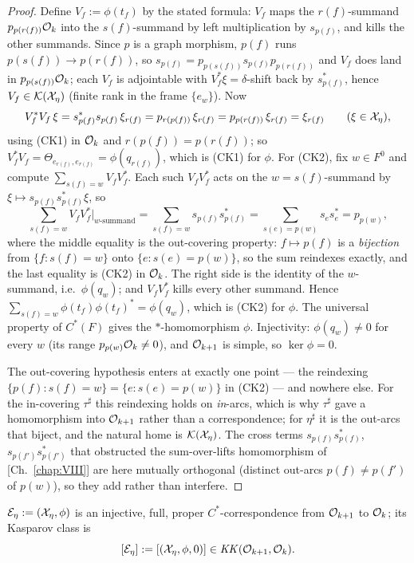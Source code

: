 \begin{proof}
Define $V_f:=\phi(t_f)$ by the stated formula: $V_f$ maps the $r(f)$-summand
$p_{p(r(f))}\mathcal{O}_k$ into the $s(f)$-summand by left multiplication by $s_{p(f)}$, and kills
the other summands. Since $p$ is a graph morphism, $p(f)$ runs $p(s(f))\to p(r(f))$, so
$s_{p(f)}=p_{p(s(f))}s_{p(f)}p_{p(r(f))}$ and $V_f$ does land in $p_{p(s(f))}\mathcal{O}_k$; each
$V_f$ is adjointable with $V_f^{*}\xi=\delta$-shift back by $s_{p(f)}^{*}$, hence
$V_f\in\mathcal{K}(\mathcal{X}_\eta)$ (finite rank in the frame $\{e_w\}$). Now
\[
V_f^{*}V_f\,\xi=s_{p(f)}^{*}s_{p(f)}\,\xi_{r(f)}
=p_{r(p(f))}\,\xi_{r(f)}=p_{p(r(f))}\,\xi_{r(f)}=\xi_{r(f)}\qquad(\xi\in\mathcal{X}_\eta),
\]
using (CK1) in $\mathcal{O}_k$ and $r(p(f))=p(r(f))$; so $V_f^{*}V_f=\Theta_{e_{r(f)},e_{r(f)}}=\phi(q_{r(f)})$,
which is (CK1) for $\phi$. For (CK2), fix $w\in F^0$ and compute $\sum_{s(f)=w}V_fV_f^{*}$.
Each such $V_fV_f^{*}$ acts on the $w=s(f)$-summand by $\xi\mapsto s_{p(f)}s_{p(f)}^{*}\xi$,
so
\[
\sum_{s(f)=w}V_fV_f^{*}\Big|_{w\text{-summand}}=\sum_{s(f)=w}s_{p(f)}s_{p(f)}^{*}
=\sum_{s(e)=p(w)}s_es_e^{*}=p_{p(w)} ,
\]
where the middle equality is the out-covering property: $f\mapsto p(f)$ is a \emph{bijection}
from $\{f:s(f)=w\}$ onto $\{e:s(e)=p(w)\}$, so the sum reindexes exactly, and the last
equality is (CK2) in $\mathcal{O}_k$. The right side is the identity of the $w$-summand, i.e.\
$\phi(q_w)$; and $V_fV_f^{*}$ kills every other summand. Hence $\sum_{s(f)=w}\phi(t_f)\phi(t_f)^{*}=\phi(q_w)$,
which is (CK2) for $\phi$. The universal property of $C^*(F)$ gives the $*$-homomorphism
$\phi$. Injectivity: $\phi(q_w)\ne0$ for every $w$ (its range $p_{p(w)}\mathcal{O}_k\ne0$), and
$\mathcal{O}_{k+1}$ is simple, so $\ker\phi=0$.

The out-covering hypothesis enters at exactly one point --- the reindexing
$\{p(f):s(f)=w\}=\{e:s(e)=p(w)\}$ in (CK2) --- and nowhere else. For the in-covering
$\tau^{\sharp}$ this reindexing holds on \emph{in}-arcs, which is why $\tau^{\sharp}$ gave a
homomorphism into $\mathcal{O}_{k+1}$ rather than a correspondence; for $\eta^{\sharp}$ it is the
out-arcs that biject, and the natural home is $\mathcal{K}(\mathcal{X}_\eta)$. The cross terms
$s_{p(f)}s_{p(f)}^{*}$, $s_{p(f')}s_{p(f')}^{*}$ that obstructed the sum-over-lifts
homomorphism of [Ch.~\ref{chap:VIII}] are here mutually orthogonal (distinct out-arcs $p(f)\ne p(f')$ of
$p(w)$), so they add rather than interfere.
\end{proof}

\begin{definition}\label{XVI:def:class}
$\mathcal{E}_\eta:=(\mathcal{X}_\eta,\phi)$ is an injective, full, proper $C^*$-correspondence from
$\mathcal{O}_{k+1}$ to $\mathcal{O}_k$; its Kasparov class is
\[
[\mathcal{E}_\eta]:=[(\mathcal{X}_\eta,\phi,0)]\in\mathit{KK}(\mathcal{O}_{k+1},\mathcal{O}_k).
\]
\end{definition}


